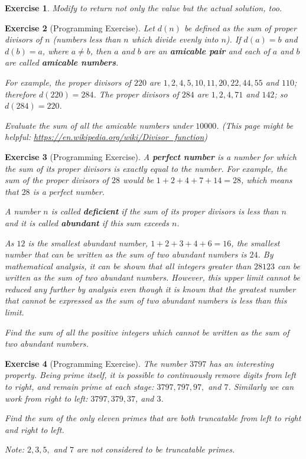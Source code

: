 \documentclass[11pt]{amsart}
\theoremstyle{theorem}
\newtheorem{exercise}{Exercise}
\begin{document}
\begin{exercise}
Modify  to return not only the value but the actual solution, too.
\end{exercise}


\begin{exercise}[Programming Exercise]
Let $d(n)$ be defined as the sum of proper divisors of $n$ (numbers less than $n$ which divide evenly into $n$). If $d(a)=b$ and $d(b)=a$, where $a\neq b$, then $a$ and $b$ are an \textbf{amicable pair} and each of $a$ and $b$ are called \textbf{amicable numbers}.

For example, the proper divisors of $220$ are $1,2,4,5,10,11,20,22,44,55$ and $110$; therefore $d(220)=284$. The proper divisors of $284$ are $1,2,4,71$ and $142$; so $d(284)=220$.

Evaluate the sum of all the amicable numbers under $10000$. (This page might be helpful: \url{https://en.wikipedia.org/wiki/Divisor_function})
\end{exercise}

\begin{exercise}[Programming Exercise]
A \textbf{perfect number} is a number for which the sum of its proper divisors is exactly equal to the number. For example, the sum of the proper divisors of $28$ would be $1+2+4+7+14=28$, which means that $28$ is a perfect number.

A number $n$ is called \textbf{deficient} if the sum of its proper divisors is less than $n$ and it is called \textbf{abundant} if this sum exceeds $n$.

As $12$ is the smallest abundant number, $1+2+3+4+6=16$, the smallest number that can be written as the sum of two abundant numbers is $24$. By mathematical analysis, it can be shown that all integers greater than $28123$ can be written as the sum of two abundant numbers. However, this upper limit cannot be reduced any further by analysis even though it is known that the greatest number that cannot be expressed as the sum of two abundant numbers is less than this limit.

Find the sum of all the positive integers which cannot be written as the sum of two abundant numbers.
\end{exercise}


\begin{exercise}[Programming Exercise]
The number $3797$ has an interesting property. Being prime itself, it is possible to continuously remove digits from left to right, and remain prime at each stage: $3797, 797,97,$ and $7$. Similarly we can work from right to left: $3797, 379, 37$, and $3$.

Find the sum of the only eleven primes that are both truncatable from left to right and right to left.

Note: $2,3,5,$ and $7$ are not considered to be truncatable primes.
\end{exercise}
\end{document}
